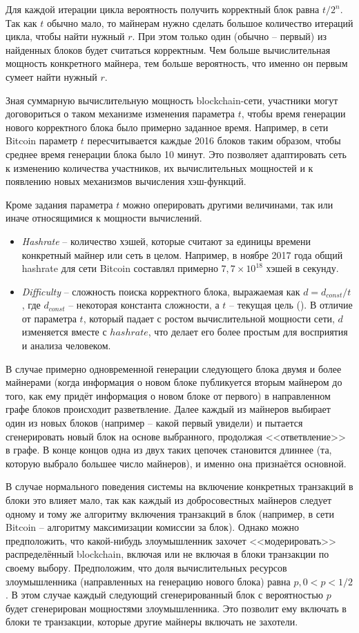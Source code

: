 Для каждой итерации цикла вероятность получить корректный блок равна $t / 2^{n}$. Так как $t$ обычно мало, то майнерам нужно сделать большое количество итераций цикла, чтобы найти нужный $r$. При этом только один (обычно -- первый) из найденных блоков будет считаться корректным. Чем больше вычислительная мощность конкретного майнера, тем больше вероятность, что именно он первым сумеет найти нужный $r$.

Зная суммарную вычислительную мощность blockchain-сети, участники могут договориться о таком механизме изменения параметра $t$, чтобы время генерации нового корректного блока было примерно заданное время. Например, в сети Bitcoin параметр $t$ пересчитывается каждые 2016 блоков таким образом, чтобы среднее время генерации блока было 10 минут. Это позволяет адаптировать сеть к изменению количества участников, их вычислительных мощностей и к появлению новых механизмов вычисления хэш-функций.

Кроме задания параметра $t$ можно оперировать другими величинами, так или иначе относящимися к мощности вычислений.
\begin{itemize}
	\item \textit{Hashrate} -- количество хэшей, которые считают за единицы времени конкретный майнер или сеть в целом. Например, в ноябре 2017 года общий hashrate для сети Bitcoin составлял примерно $7,7 \times 10^{18}$ хэшей в секунду.
	\item \textit{Difficulty} -- сложность поиска корректного блока, выражаемая как $d = d_{const} / t$, где $d_{const}$ -- некоторая константа сложности, а $t$ -- текущая цель (). В отличие от параметра $t$, который падает с ростом вычислительной мощности сети, $d$ изменяется вместе с $hashrate$, что делает его более простым для восприятия и анализа человеком.
\end{itemize}

В случае примерно одновременной генерации следующего блока двумя и более майнерами (когда информация о новом блоке публикуется вторым майнером до того, как ему придёт информация о новом блоке от первого) в направленном графе блоков происходит разветвление. Далее каждый из майнеров выбирает один из новых блоков (например -- какой первый увидели) и пытается сгенерировать новый блок на основе выбранного, продолжая <<ответвление>> в графе. В конце концов одна из двух таких цепочек становится длиннее (та, которую выбрало большее число майнеров), и именно она признаётся основной.

В случае нормального поведения системы на включение конкретных транзакций в блоки это влияет мало, так как каждый из добросовестных майнеров следует одному и тому же алгоритму включения транзакций в блок (например, в сети Bitcoin -- алгоритму максимизации комиссии за блок). Однако можно предположить, что какой-нибудь злоумышленник захочет <<модерировать>> распределённый blockchain, включая или не включая в блоки транзакции по своему выбору. Предположим, что доля вычислительных ресурсов злоумышленника (направленных на генерацию нового блока) равна $p, 0 < p < 1/2$. В этом случае каждый следующий сгенерированный блок с вероятностью $p$ будет сгенерирован мощностями злоумышленника. Это позволит ему включать в блоки те транзакции, которые другие майнеры включать не захотели.

